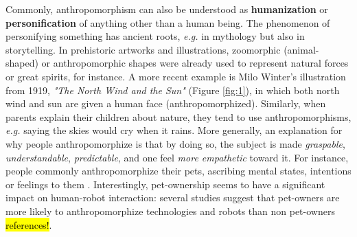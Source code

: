 \documentclass{frontiersSCNS} %
\begin{document}
Commonly, anthropomorphism can also be understood as \textbf{humanization} or
\textbf{personification} of anything other than a human being. The phenomenon of
personifying something has ancient roots, \textit{e.g.} in mythology but also in
storytelling. In prehistoric artworks and illustrations, zoomorphic
(animal-shaped) or anthropomorphic shapes were already used to represent natural
forces or great spirits, for instance. A more recent example is Milo Winter's
illustration from 1919, \textit{"The North Wind and the Sun"} (Figure
\ref{fig:1}), in which both north wind and sun are given a human face
(anthropomorphized). Similarly, when parents explain their children about
nature, they tend to use anthropomorphisms, \textit{e.g.} saying the skies would
cry when it rains. More generally, an explanation for why people
anthropomorphize is that by doing so, the subject is made \emph{graspable},
\emph{understandable}, \emph{predictable}, and one feel \emph{more empathetic}
toward it. For instance, people commonly anthropomorphize their pets,
ascribing mental states, intentions or feelings to them
\cite{eddy_attribution_1993}. Interestingly, pet-ownership seems to have a
significant impact on human-robot interaction: several studies suggest that
pet-owners are more likely to anthropomorphize technologies and robots than non
pet-owners \hl{references!}.
\end{document}
